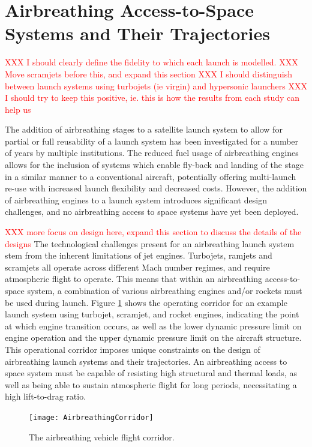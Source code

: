   
  \section{Airbreathing Access-to-Space Systems and Their Trajectories}\label{sec:AscentTrajectories}

  \textcolor{red}{XXX I should clearly define the fidelity to which each launch is modelled.}
  \textcolor{red}{XXX Move scramjets before this, and expand this section}
  \textcolor{red}{XXX I should distinguish between launch systems using turbojets (ie virgin) and hypersonic launchers}
  \textcolor{red}{XXX I should try to keep this positive, ie. this is how the results from each study can help us}
  
    The addition of airbreathing stages to a satellite launch system to allow for partial or full reusability of a launch system has been investigated for a number of years by multiple institutions\cite{Powell1991,Wilhite1991,Varvill2008,Tsuchiya2005,Mehta2001,Preller2017b,Trefny1999,Roche2000,Young2006,Bradford2000,Gong2014}. The reduced fuel usage of airbreathing engines allows for the inclusion of systems which enable fly-back and landing of the stage in a similar manner to a conventional aircraft, potentially offering multi-launch re-use with increased launch flexibility and decreased costs\cite{Preller2017b}. However, the addition of airbreathing engines to a launch system introduces significant design challenges, and 
    no airbreathing access to space systems have yet been deployed. 
    
      \textcolor{red}{XXX more focus on design here, expand this section to discuss the details of the designs}
    The technological challenges present for an airbreathing launch system stem from the inherent limitations of jet engines. Turbojets, ramjets and scramjets all operate across different Mach number regimes, and require atmospheric flight to operate\cite{Smart2009}. 
    This means that within an airbreathing access-to-space system, a combination of various airbreathing engines and/or rockets must be used during launch.
    Figure \ref{fig:AirbreathingCorridor} shows the operating corridor for an example launch system using turbojet, scramjet, and rocket engines, indicating the point at which engine transition occurs, as well as the lower dynamic pressure limit on engine operation and the upper dynamic pressure limit on the aircraft structure.
    This operational corridor imposes unique constraints on the design of airbreathing launch systems and their trajectories. An airbreathing access to space system must be capable of resisting high structural and thermal loads, as well as being able to sustain atmospheric flight for long periods, necessitating a high lift-to-drag ratio. 
    \begin{figure}[ht]
    	\centering
    	\texttt{[image: AirbreathingCorridor]}
    	\caption{The airbreathing vehicle flight corridor\cite{Smart2010}.}
    	\label{fig:AirbreathingCorridor}
    \end{figure}
    

